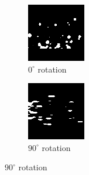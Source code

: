 \documentclass[10pt,twocolumn,letterpaper]{article}
\begin{document}
\begin{figure}
  \centering
  \begin{subfigure}{.33\linewidth}
    \includegraphics[width=\linewidth]{img_aug}
    \caption{$0^\circ$ rotation}
    \label{fig:img_aug_0}
  \end{subfigure}
  \qquad
  \begin{subfigure}{0.33\linewidth}
    \includegraphics[width=\linewidth]{img_aug_rot_90}
    \caption{$90^\circ$ rotation}
    \label{fig:img_aug_90}
  \end{subfigure}
  

\end{figure}
\end{document}
